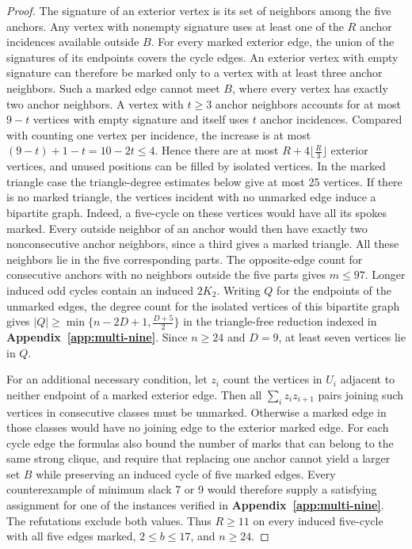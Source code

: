 \documentclass[preprint,11pt,numbers]{elsarticle-arxiv}
\numberwithin{equation}{section}
\theoremstyle{definition}
\begin{document}
\begin{proof}
The signature of an exterior vertex is its set of
neighbors among the five anchors. Any vertex with
nonempty signature uses at least one of the $R$ anchor
incidences available outside $B$. For every marked
exterior edge, the union of the signatures of its
endpoints covers the cycle edges. An exterior vertex
with empty signature can therefore be marked only to
a vertex with at least three anchor neighbors. Such a
marked edge cannot meet $B$, where every vertex has
exactly two anchor neighbors. A vertex with $t\ge3$
anchor neighbors accounts for at most $9-t$ vertices with
empty signature and itself uses $t$ anchor incidences.
Compared with counting one vertex per incidence, the
increase is at most $(9-t)+1-t=10-2t\le4$. Hence there
are at most $R+4\lfloor\frac{R}{3}\rfloor$ exterior
vertices, and unused positions can be filled by isolated
vertices. In the marked triangle case the triangle-degree estimates below give
at most 25 vertices. If there is no marked triangle, the vertices
incident with no unmarked edge induce a bipartite graph. Indeed, a
five-cycle on these vertices would have all its spokes marked. Every
outside neighbor of an anchor would then have exactly two
nonconsecutive anchor neighbors, since a third gives a marked
triangle. All these neighbors lie in the five corresponding parts.
The opposite-edge count for consecutive anchors with no neighbors
outside the five parts gives $m\leq97$. Longer induced odd cycles
contain an induced $2K_2$. Writing $Q$ for the endpoints of the
unmarked edges, the degree count for the isolated vertices of this
bipartite graph gives
$|Q|\geq\min\{n-2D+1,\frac{D+5}{2}\}$ in the triangle-free
reduction indexed in \textbf{Appendix~\ref{app:multi-nine}}.
Since $n\geq24$ and $D=9$, at least seven vertices lie in $Q$.

For an additional necessary condition, let $z_i$ count the
vertices in $U_i$ adjacent to neither endpoint of a
marked exterior edge. Then all $\sum_i z_i z_{i+1}$
pairs joining such vertices in consecutive classes must
be unmarked. Otherwise a marked edge in those classes would have no joining
edge to the exterior marked edge. For each cycle edge the formulas
also bound the number of marks that can belong to the same strong clique,
and require that replacing one anchor cannot yield a
larger set $B$ while preserving an induced cycle of
five marked edges.
Every counterexample of minimum slack 7 or 9 would therefore
supply a satisfying assignment for one of the instances verified
in \textbf{Appendix~\ref{app:multi-nine}}. The refutations exclude both
values. Thus $R\geq11$ on every induced five-cycle with all five
edges marked, $2\leq b\leq17$, and $n\geq24$.

\end{proof}
\end{document}
